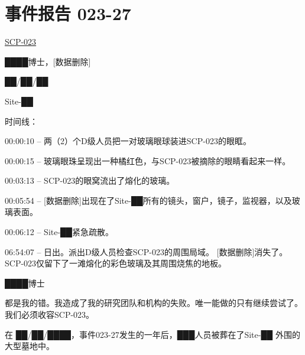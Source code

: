 \chapter{
    事件报告 023-27
}

\label{chap:DOC-incident-023-27}

\hyperref[chap:SCP-023]{SCP-023}

████博士，[数据删除]

██\slash ██\slash ██

Site-██

时间线：

00:00:10 – 两（2）个D级人员把一对玻璃眼球装进SCP-023的眼眶。

00:00:15 – 玻璃眼珠呈现出一种橘红色，与SCP-023被摘除的眼睛看起来一样。

00:03:13 – SCP-023的眼窝流出了熔化的玻璃。

00:05:54 – [数据删除]出现在了Site-██所有的镜头，窗户，镜子，监视器，以及玻璃表面。

00:06:12 – Site-██紧急疏散。

06:54:07 – 日出。派出D级人员检查SCP-023的周围局域。 [数据删除]消失了。SCP-023仅留下了一滩熔化的彩色玻璃及其周围烧焦的地板。

\hr

████博士


都是我的错。我造成了我的研究团队和机构的失败。唯一能做的只有继续尝试了。我们必须收容SCP-023。

 在 ██\slash ██\slash ████，事件023-27发生的一年后，███人员被葬在了Site-██ 外围的大型墓地中。
